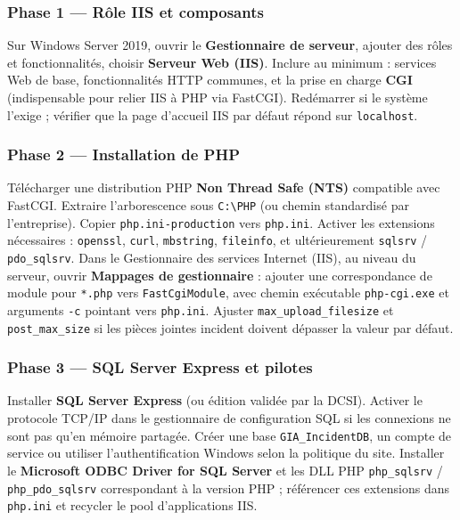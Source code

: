 \subsubsection{Phase 1 — Rôle IIS et composants}
Sur Windows Server 2019, ouvrir le \textbf{Gestionnaire de serveur}, ajouter des rôles et
fonctionnalités, choisir \textbf{Serveur Web (IIS)}. Inclure au minimum : services Web de base,
fonctionnalités HTTP communes, et la prise en charge \textbf{CGI} (indispensable pour relier IIS à
PHP via FastCGI). Redémarrer si le système l'exige ; vérifier que la page d'accueil IIS par défaut
répond sur \texttt{localhost}.

\subsubsection{Phase 2 — Installation de PHP}
Télécharger une distribution PHP \textbf{Non Thread Safe (NTS)} compatible avec FastCGI. Extraire
l'arborescence sous \texttt{C:\textbackslash PHP} (ou chemin standardisé par l'entreprise). Copier
\texttt{php.ini-production} vers \texttt{php.ini}. Activer les extensions nécessaires :
\texttt{openssl}, \texttt{curl}, \texttt{mbstring}, \texttt{fileinfo}, et ultérieurement
\texttt{sqlsrv} / \texttt{pdo\_sqlsrv}. Dans le Gestionnaire des services Internet (IIS), au niveau
du serveur, ouvrir \textbf{Mappages de gestionnaire} : ajouter une correspondance de module pour
\texttt{*.php} vers \texttt{FastCgiModule}, avec chemin exécutable \texttt{php-cgi.exe} et arguments
\texttt{-c} pointant vers \texttt{php.ini}. Ajuster \texttt{max\_upload\_filesize} et
\texttt{post\_max\_size} si les pièces jointes incident doivent dépasser la valeur par défaut.

\subsubsection{Phase 3 — SQL Server Express et pilotes}
Installer \textbf{SQL Server Express} (ou édition validée par la DCSI). Activer le protocole TCP/IP
dans le gestionnaire de configuration SQL si les connexions ne sont pas qu'en mémoire partagée.
Créer une base \texttt{GIA\_IncidentDB}, un compte de service ou utiliser l'authentification
Windows selon la politique du site. Installer le \textbf{Microsoft ODBC Driver for SQL Server} et
les DLL PHP \texttt{php\_sqlsrv} / \texttt{php\_pdo\_sqlsrv} correspondant à la version PHP ;
référencer ces extensions dans \texttt{php.ini} et recycler le pool d'applications IIS.

